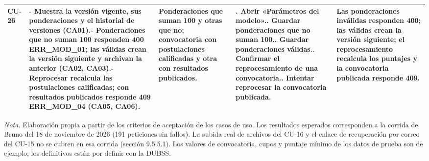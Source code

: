 {\begin{longtable}{@{}>{\raggedright\arraybackslash}p{1.2cm}>{\raggedright\arraybackslash}p{3.7cm}>{\raggedright\arraybackslash}p{3.0cm}>{\raggedright\arraybackslash}p{4.4cm}>{\raggedright\arraybackslash}p{3.4cm}@{}}
\midrule
\textbf{CU-26} & - Muestra la versión vigente, sus ponderaciones y el historial de versiones (CA01).\newline - Ponderaciones que no suman 100 responden 400 ERR\_MOD\_01; las válidas crean la versión siguiente y archivan la anterior (CA02, CA03).\newline - Reprocesar recalcula las postulaciones calificadas; con resultados publicados responde 409 ERR\_MOD\_04 (CA05, CA06). & Ponderaciones que suman 100 y otras que no; convocatoria con postulaciones calificadas y otra con resultados publicados. & 1. Abrir «Parámetros del modelo».\newline 2. Guardar ponderaciones que no suman 100.\newline 3. Guardar ponderaciones válidas.\newline 4. Confirmar el reprocesamiento de una convocatoria.\newline 5. Intentar reprocesar la convocatoria publicada. & Las ponderaciones inválidas responden 400; las válidas crean la versión siguiente; el reprocesamiento recalcula los puntajes y la convocatoria publicada responde 409. \\
\bottomrule
\end{longtable}
}

\noindent\footnotesize\textit{Nota.} Elaboración propia a partir de los criterios de aceptación de los casos de uso. Los resultados esperados corresponden a la corrida de Bruno del 18 de noviembre de 2026 (191 peticiones sin fallos). La subida real de archivos del CU-16 y el enlace de recuperación por correo del CU-15 no se cubren en esa corrida (sección 9.5.5.1). Los valores de convocatoria, cupos y puntaje mínimo de los datos de prueba son de ejemplo; los definitivos están por definir con la DUBSS.\normalsize
